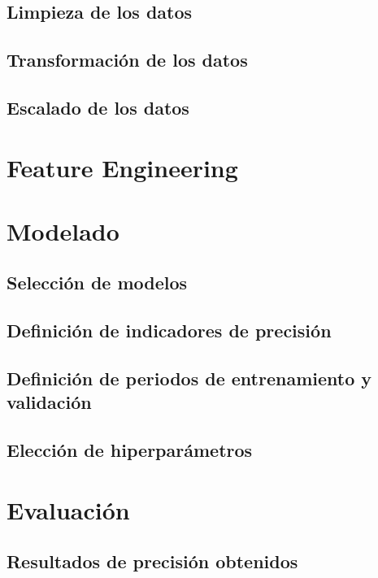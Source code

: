 \documentclass[IB]{TFUOC}
\begin{document}
\subsection{Limpieza de los datos}

\subsection{Transformación de los datos}

\subsection{Escalado de los datos}

\section{Feature Engineering}

\section{Modelado}

\subsection{Selección de modelos}

\subsection{Definición de indicadores de precisión}

\subsection{Definición de periodos de entrenamiento y validación}

\subsection{Elección de hiperparámetros}

\section{Evaluación}

\subsection{Resultados de precisión obtenidos}
\end{document}
